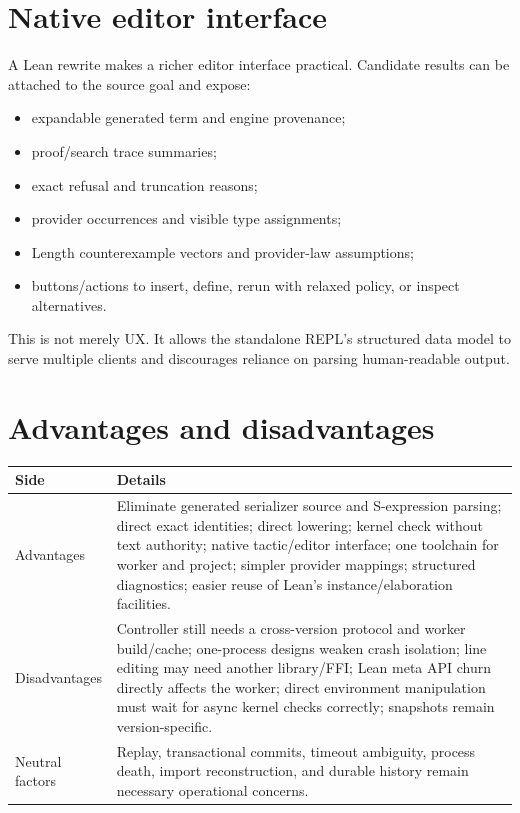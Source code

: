 \documentclass[10pt,letterpaper,oneside]{report}
\newcommand{\code}[1]{\texttt{\detokenize{#1}}}
\begin{document}
\section{Native editor interface}

A Lean rewrite makes a richer editor interface practical. Candidate results can be attached to the source goal and expose:

\begin{itemize}
  \item expandable generated term and engine provenance;
  \item proof/search trace summaries;
  \item exact refusal and truncation reasons;
  \item provider occurrences and visible type assignments;
  \item Length counterexample vectors and provider-law assumptions;
  \item buttons/actions to insert, define, rerun with relaxed policy, or inspect alternatives.
\end{itemize}

This is not merely UX. It allows the standalone REPL's structured data model to serve multiple clients and discourages reliance on parsing human-readable output.

\section{Advantages and disadvantages}

\begin{longtable}{@{}L{0.18\textwidth}L{0.74\textwidth}@{}}
\toprule
\textbf{Side} & \textbf{Details} \\
\midrule
\endhead
Advantages & Eliminate generated serializer source and S-expression parsing; direct exact identities; direct \code{Expr} lowering; kernel check without text authority; native tactic/editor interface; one toolchain for worker and project; simpler provider mappings; structured diagnostics; easier reuse of Lean's instance/elaboration facilities. \\
Disadvantages & Controller still needs a cross-version protocol and worker build/cache; one-process designs weaken crash isolation; line editing may need another library/FFI; Lean meta API churn directly affects the worker; direct environment manipulation must wait for async kernel checks correctly; snapshots remain version-specific. \\
Neutral factors & Replay, transactional commits, timeout ambiguity, process death, import reconstruction, and durable history remain necessary operational concerns. \\
\bottomrule
\end{longtable}
\end{document}
